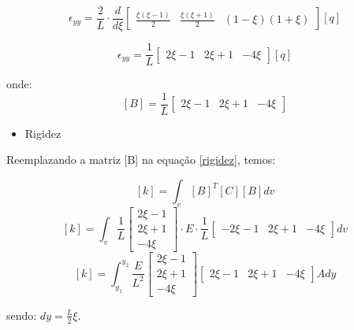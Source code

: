 \documentclass{article} %
\begin{document}
\begin{equation*}
\epsilon_{yy}=\frac{2}{L}\cdot\frac{d}{d\xi}\begin{bmatrix}
\frac{\xi(\xi-1)}{2}&\frac{\xi(\xi+1)}{2}&(1-\xi)(1+\xi)
\end{bmatrix}[q]
\end{equation*}

\begin{equation}\label{deforma2}
\epsilon_{yy}=\frac{1}{L}\begin{bmatrix}
2\xi-1&2\xi+1&-4\xi
\end{bmatrix}[q]
\end{equation}

\indent onde:
\begin{equation}\label{matrizb2}
[B]=\frac{1}{L}\begin{bmatrix}
2\xi-1&2\xi+1&-4\xi
\end{bmatrix}
\end{equation}



\begin{itemize}
	\item Rigidez
\end{itemize}

\indent Reemplazando a matriz [B] na equação \ref{rigidez}, temos:

 \begin{equation*}\label{}
[k]= \int_{v}[B]^T[C][B]dv
\end{equation*}
\begin{equation*}\label{}
[k]= \int_{v}\frac{1}{L}\begin{bmatrix}
2\xi-1\\2\xi+1\\-4\xi
\end{bmatrix}\cdot E\cdot \frac{1}{L}\begin{bmatrix}
-2\xi-1&2\xi+1&-4\xi
\end{bmatrix}dv
\end{equation*}
\begin{equation*}\label{}
[k]= \int_{y_1}^{y_2}\frac{E}{L^2}\begin{bmatrix}
2\xi-1\\2\xi+1\\-4\xi
\end{bmatrix}\begin{bmatrix}
2\xi-1&2\xi+1&-4\xi
\end{bmatrix}Ady
\end{equation*}

\indent sendo: \(dy=\frac{L}{2}\xi\).
\end{document}

